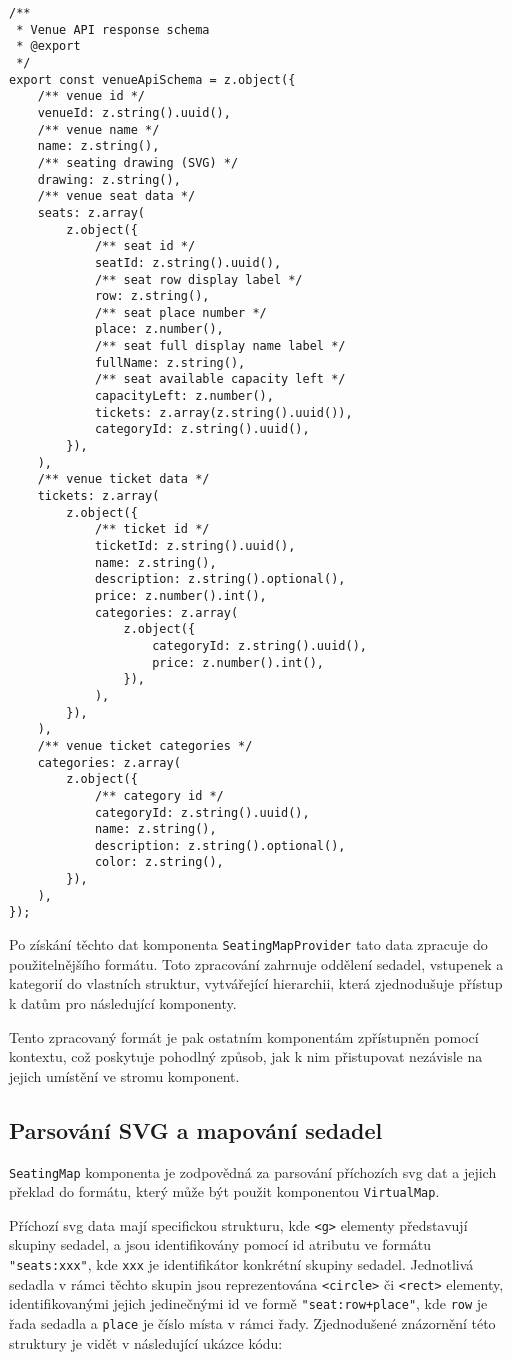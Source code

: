 \begin{verbatim}
/**
 * Venue API response schema
 * @export
 */
export const venueApiSchema = z.object({
	/** venue id */
	venueId: z.string().uuid(),
	/** venue name */
	name: z.string(),
	/** seating drawing (SVG) */
	drawing: z.string(),
	/** venue seat data */
	seats: z.array(
		z.object({
			/** seat id */
			seatId: z.string().uuid(),
			/** seat row display label */
			row: z.string(),
			/** seat place number */
			place: z.number(),
			/** seat full display name label */
			fullName: z.string(),
			/** seat available capacity left */
			capacityLeft: z.number(),
			tickets: z.array(z.string().uuid()),
			categoryId: z.string().uuid(),
		}),
	),
	/** venue ticket data */
	tickets: z.array(
		z.object({
			/** ticket id */
			ticketId: z.string().uuid(),
			name: z.string(),
			description: z.string().optional(),
			price: z.number().int(),
			categories: z.array(
				z.object({
					categoryId: z.string().uuid(),
					price: z.number().int(),
				}),
			),
		}),
	),
	/** venue ticket categories */
	categories: z.array(
		z.object({
			/** category id */
			categoryId: z.string().uuid(),
			name: z.string(),
			description: z.string().optional(),
			color: z.string(),
		}),
	),
});
\end{verbatim}

Po získání těchto dat komponenta \texttt{SeatingMapProvider} tato data zpracuje do použitelnějšího formátu.
Toto zpracování zahrnuje oddělení sedadel, vstupenek a kategorií do vlastních struktur, vytvářející hierarchii, která zjednodušuje přístup k datům pro následující komponenty.

Tento zpracovaný formát je pak ostatním komponentám zpřístupněn pomocí kontextu, což poskytuje pohodlný způsob, jak k nim přistupovat nezávisle na jejich umístění ve stromu komponent.

\subsection{Parsování SVG a mapování sedadel}
\label{subsec:implementace-seating-svg}
\texttt{SeatingMap} komponenta je zodpovědná za parsování příchozích \ac{svg} dat a jejich překlad do formátu, který může být použit komponentou \texttt{VirtualMap}.

Příchozí \ac{svg} data mají specifickou strukturu, kde \texttt{<g>} elementy představují skupiny sedadel, a jsou identifikovány pomocí id atributu ve formátu \texttt{"seats:xxx"}, kde \texttt{xxx} je identifikátor konkrétní skupiny sedadel.
Jednotlivá sedadla v rámci těchto skupin jsou reprezentována \texttt{<circle>} či \texttt{<rect>} elementy, identifikovanými jejich jedinečnými id ve formě \texttt{"seat:row+place"}, kde \texttt{row} je řada sedadla a \texttt{place} je číslo místa v rámci řady.
Zjednodušené znázornění této struktury je vidět v následující ukázce kódu:

